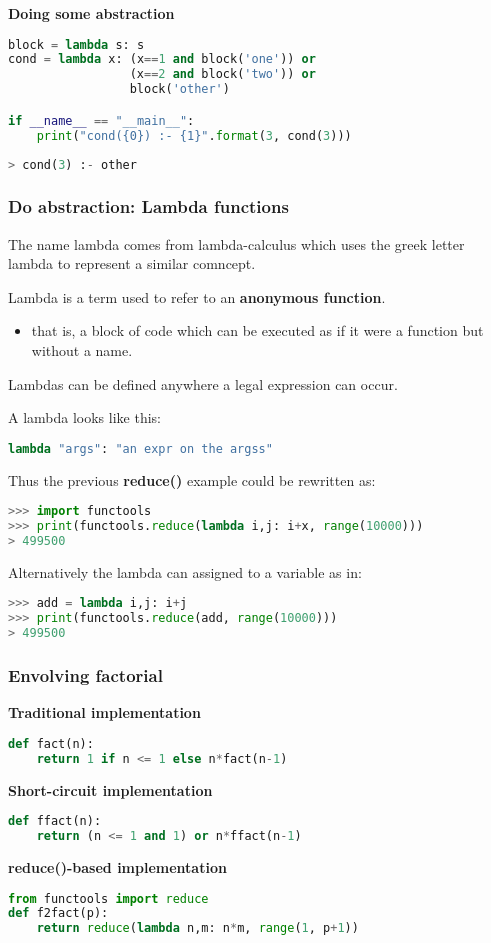 \textbf{Doing some abstraction}
\begin{lstlisting}[language=Python]
block = lambda s: s
cond = lambda x: (x==1 and block('one')) or 
                 (x==2 and block('two')) or 
                 block('other')

if __name__ == "__main__":
	print("cond({0}) :- {1}".format(3, cond(3)))
\end{lstlisting}
\begin{lstlisting}[language=Python]
> cond(3) :- other
\end{lstlisting}


\subsubsection{Do abstraction: Lambda functions}
The name lambda comes from lambda-calculus which uses the greek letter lambda to represent a similar comncept.

Lambda is a term used to refer to an \textbf{anonymous function}.
\begin{itemize}
	\item that is, a block of code which can be executed as if it were a function but without a name.
\end{itemize}

Lambdas can be defined anywhere a legal expression can occur.

A lambda looks like this:
\begin{lstlisting}[language=Python]
lambda "args": "an expr on the argss"
\end{lstlisting}

Thus the previous \textbf{reduce()} example could be rewritten as:
\begin{lstlisting}[language=Python]
>>> import functools
>>> print(functools.reduce(lambda i,j: i+x, range(10000)))
> 499500
\end{lstlisting}
Alternatively the lambda can assigned to a variable as in:
\begin{lstlisting}[language=Python]
>>> add = lambda i,j: i+j
>>> print(functools.reduce(add, range(10000)))
> 499500
\end{lstlisting}

\subsubsection{Envolving factorial}

\textbf{Traditional implementation}
\begin{lstlisting}[language=Python]
def fact(n):
	return 1 if n <= 1 else n*fact(n-1)
\end{lstlisting}
\textbf{Short-circuit implementation}
\begin{lstlisting}[language=Python]
def ffact(n):
	return (n <= 1 and 1) or n*ffact(n-1)	
\end{lstlisting}
\textbf{reduce()-based implementation}
\begin{lstlisting}[language=Python]
from functools import reduce
def f2fact(p):
	return reduce(lambda n,m: n*m, range(1, p+1))
\end{lstlisting}

